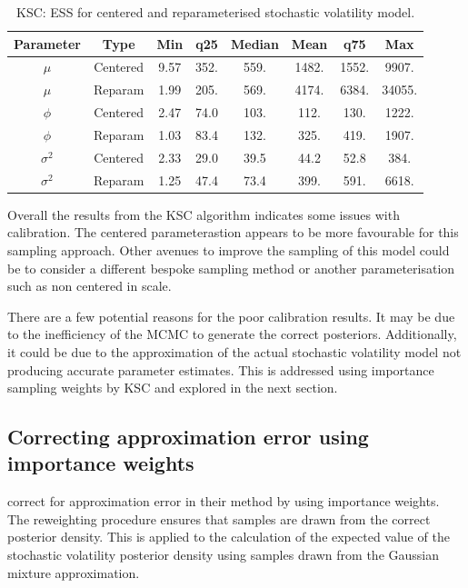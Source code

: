 \documentclass[12pt, a4paper]{article}
\begin{document}
    \begin{table}[H]
        \centering
        \begin{tabular}{|c|c|c|c|c|c|c|c|} \hline 
        Parameter &  Type&Min& q25&  Median& Mean & q75&Max\\ \hline 
        $\mu$&  Centered&9.57 & 352. & 559. & 1482. & 1552. & 9907.\\
     $\mu$&  Reparam&1.99 & 205. & 569. & 4174. & 6384. & 34055.\\\hline 
     $\phi$&  Centered&2.47 & 74.0 & 103. & 112. & 130. & 1222.\\
     $\phi$&  Reparam&1.03 & 83.4 & 132. & 325. & 419. & 1907. \\ \hline 
     $\sigma^2$&  Centered&2.33 & 29.0 & 39.5 & 44.2 & 52.8 & 384. \\ 
     $\sigma^2$&  Reparam&1.25 & 47.4 & 73.4 & 399. & 591. & 6618. \\ \hline
        \end{tabular}
        \caption{KSC: ESS for centered and reparameterised stochastic volatility model.}
        \label{tab:kscess}
    \end{table}

    Overall the results from the KSC algorithm indicates some issues with calibration. The centered parameterastion appears to be more favourable for this sampling approach. Other avenues to improve the sampling of this model could be to consider a different bespoke sampling method or another parameterisation such as non centered in scale.

    There are a few potential reasons for the poor calibration results. It may be due to the inefficiency of the MCMC to generate the correct posteriors. Additionally, it could be due to the approximation of the actual stochastic volatility model not producing accurate parameter estimates. This is addressed using importance sampling weights by KSC and explored in the next section.  

    \subsection{Correcting approximation error using importance weights}
    \citet{kim1998stochastic} correct for approximation error in their method by using importance weights. The reweighting procedure ensures that samples are drawn from the correct posterior density. This is applied to the calculation of the expected value of the stochastic volatility posterior density using samples drawn from the Gaussian mixture approximation. 
\end{document}
